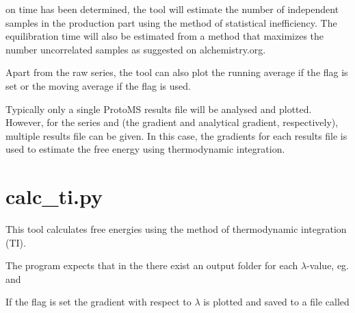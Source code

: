\documentclass[letterpaper,10pt,english]{sphinxmanual}
\begin{document}
on time has been determined, the tool will estimate the number of independent samples in the production part using the method of statistical inefficiency. The equilibration time will also be estimated from a method that maximizes the number uncorrelated samples as suggested on alchemistry.org.

Apart from the raw series, the tool can also plot the running average if the  flag is set or the moving average if the  flag is used.

Typically only a single ProtoMS results file will be analysed and plotted. However, for the series  and  (the gradient and analytical gradient, respectively), multiple results file can be given. In this case, the gradients for each results file is used to estimate the free energy using thermodynamic integration.


\section{calc\_ti.py}
\label{\detokenize{tools:calc-ti-py}}

%
\begin{sphinxVerbatim}[commandchars=\\\{\}]
  
  
  
   
\end{sphinxVerbatim}


This tool calculates free energies using the method of thermodynamic integration (TI).

The program expects that in the  there exist an output folder for each \(\lambda\)-value, eg.  and 

If the  flag is set the gradient with respect to \(\lambda\) is plotted and saved to a file called 
\end{document}
